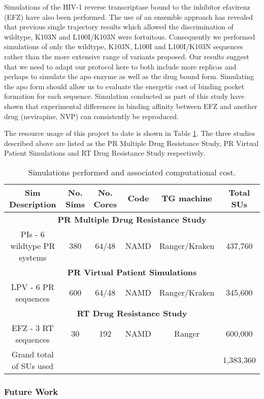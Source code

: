 \documentclass[a4paper,12pt]{article}
\begin{document}
Simulations of the HIV-1 reverse transcriptase bound to the inhibitor efavirenz (EFZ) have also 
been performed. The use of an ensemble approach has revealed that previous single trajectory results 
which allowed the discrimination of wildtype, K103N and L100I/K103N were fortuitous. Consequently we 
performed simulations of only the wildtype, K103N, L100I and L100I/K103N sequences rather than the 
more extensive range of variants proposed. Our results suggest that we need to adapt our protocol here 
to both include more replicas and perhaps to simulate the apo enzyme as well as the drug bound form. 
Simulating the apo form should allow us to evaluate the energetic cost of binding pocket formation 
for each sequence. Simulation conducted as part of this study have shown that experimental differences 
in binding affinity between EFZ and another drug (nevirapine, NVP) can consistently be reproduced.

The resource usage of this project to date is shown in Table \ref{t:hiv_used}. The three studies 
described above are listed as the PR Multiple Drug Resistance Study, PR Virtual Patient Simulations 
and RT Drug Resistance Study respectively.

\begin{table}[h]
\scriptsize
\centering
\begin{tabular}[b]
{|c|c|c|c|c|c|}
\hline
\textbf{Sim Description} & \textbf{No. Sims} &
\textbf{No. Cores} & \textbf{Code} & \textbf{TG machine} & \textbf{Total SUs}\\
\hline
\multicolumn{6}{|c|}{\textbf{PR Multiple Drug Resistance Study}}\\
\hline
PIs - 6 wildtype PR systems & 380 & 64/48 & NAMD & Ranger/Kraken & 437,760 \\
\hline
\multicolumn{6}{|c|}{\textbf{PR Virtual Patient Simulations}}\\
\hline
LPV - 6 PR sequences & 600 & 64/48 & NAMD & Ranger/Kraken & 345,600 \\
\hline
\multicolumn{6}{|c|}{\textbf{RT Drug Resistance Study}}\\
\hline
EFZ - 3 RT sequences & 30 & 192 & NAMD & Ranger & 600,000\\
\hline
Grand total of SUs used & & & & & 1,383,360 \\
\hline
\end{tabular} \caption{Simulations performed and associated computational cost.}
\label{t:hiv_used}
\end{table}

\subsubsection{Future Work}\label{se:hiv_future}
\end{document}
